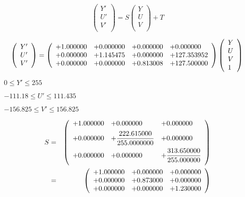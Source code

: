 \documentclass{article}
\begin{document}
\[ \left( \begin{array}{l} Y' \\ U' \\ V' \\ \end{array} \right) = S \left( \begin{array}{l} Y \\ U \\ V \\ \end{array} \right) + T \]
\pagebreak

\[ \left( \begin{array}{l} Y' \\ U' \\ V' \\ \end{array} \right) = \left( \begin{array}{llll} +1.000000 & +0.000000 & +0.000000 & +0.000000 \\ +0.000000 & +1.145475 & +0.000000 & +127.353952 \\ +0.000000 & +0.000000 & +0.813008 & +127.500000 \\ \end{array} \right) \left( \begin{array}{l} Y \\ U \\ V \\ 1 \\ \end{array} \right) \\ \]
\pagebreak

$ 0 \le Y' \le 255 $
\pagebreak

$ -111.18 \le U' \le 111.435 $
\pagebreak

$ -156.825 \le V' \le 156.825 $
\pagebreak

\begin{eqnarray*} S &=& \left( \begin{array}{lll} +1.000000 & +0.000000 & +0.000000 \vspace{.5em} \\ +0.000000 & +\dfrac{222.615000}{255.0000000} & +0.000000 \vspace{.5em} \\ +0.000000 & +0.000000 & +\dfrac{313.650000}{255.000000} \vspace{.5em} \\ \end{array} \right) \\ &=& \left( \begin{array}{lll} +1.000000 & +0.000000 & +0.000000 \\ +0.000000 & +0.873000 & +0.000000 \\ +0.000000 & +0.000000 & +1.230000 \\ \end{array} \right) \\ \end{eqnarray*}
\pagebreak
\end{document}
